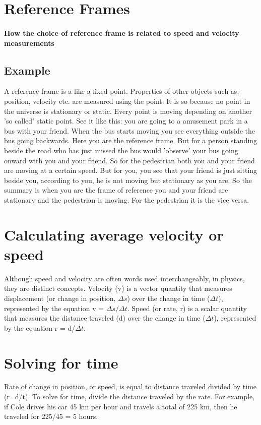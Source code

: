 \documentclass{article}
\theoremstyle{mytheoremstyle}
\theoremstyle{mytheoremstyle}
\theoremstyle{myproblemstyle}
\begin{document}
\section{Reference Frames}
\paragraph{How the choice of reference frame is related to speed and velocity measurements}
\subsection{Example}
A reference frame is a like a fixed point. Properties of other objects such as: position, velocity etc. are measured using the point.
It is so because no point in the universe is stationary or static. Every point is moving depending on another 'so called' static point.
See it like this: you are going to a amusement park in a bus with your friend. When the bus starts moving you see everything outside the bus going backwards. Here you are the reference frame. But for a person standing beside the road who has just missed the bus would 'observe' your bus going onward with you and your friend. So for the pedestrian both you and your friend are moving at a certain speed. But for you, you see that your friend is just sitting beside you, according to you, he is not moving but stationary as you are.
So the summary is when you are the frame of reference you and your friend are stationary and the pedestrian is moving. For the pedestrian it is the vice versa.

\section{Calculating average velocity or speed}
Although speed and velocity are often words used interchangeably, in physics, they are distinct concepts. Velocity (v) is a vector quantity that measures displacement (or change in position, $\Delta {s} $) over the change in time ($\Delta {t} $), represented by the equation v = $\Delta {s}/ \Delta {t}  $. Speed (or rate, r) is a scalar quantity that measures the distance traveled (d) over the change in time ($\Delta {t}$), represented by the equation r = d/$\Delta {t}$.
\section{Solving for time}
Rate of change in position, or speed, is equal to distance traveled divided by time (r=d/t). To solve for time, divide the distance traveled by the rate. For example, if Cole drives his car 45 km per hour and travels a total of 225 km, then he traveled for 225/45 = 5 hours.
\end{document}
